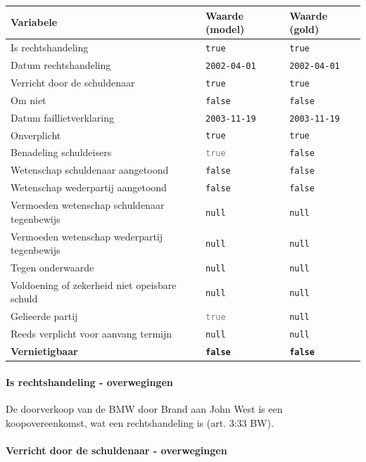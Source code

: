 \documentclass[
  dutch,
  a4paper,
]{article}
\begin{document}
\begin{center}
\small
\begin{tabular}{@{}p{7.4cm}p{2.6cm}p{2.6cm}@{}}
\toprule
Variabele & Waarde (model) & Waarde (gold) \\
\midrule
Is rechtshandeling & \texttt{true} & \texttt{true} \\
Datum rechtshandeling & \texttt{2002-04-01} & \texttt{2002-04-01} \\
Verricht door de schuldenaar & \texttt{true} & \texttt{true} \\
Om niet & \texttt{false} & \texttt{false} \\
Datum faillietverklaring & \texttt{2003-11-19} & \texttt{2003-11-19} \\
Onverplicht & \texttt{true} & \texttt{true} \\
Benadeling schuldeisers & \textcolor{gray}{\texttt{true}} & \texttt{false} \\
Wetenschap schuldenaar aangetoond & \texttt{false} & \texttt{false} \\
Wetenschap wederpartij aangetoond & \texttt{false} & \texttt{false} \\
Vermoeden wetenschap schuldenaar tegenbewijs & \texttt{null} & \texttt{null} \\
Vermoeden wetenschap wederpartij tegenbewijs & \texttt{null} & \texttt{null} \\
Tegen onderwaarde & \texttt{null} & \texttt{null} \\
Voldoening of zekerheid niet opeisbare schuld & \texttt{null} & \texttt{null} \\
Gelieerde partij & \textcolor{gray}{\texttt{true}} & \texttt{null} \\
Reeds verplicht voor aanvang termijn & \texttt{null} & \texttt{null} \\
\textbf{Vernietigbaar} & \textbf{\texttt{false}} & \textbf{\texttt{false}} \\
\bottomrule
\end{tabular}
\end{center}

\paragraph{Is rechtshandeling - overwegingen}\label{is-rechtshandeling---overwegingen-60}

De doorverkoop van de BMW door Brand aan John West is een koopovereenkomst, wat een rechtshandeling is (art. 3:33 BW).

\paragraph{Verricht door de schuldenaar - overwegingen}\label{verricht-door-de-schuldenaar---overwegingen-60}
\end{document}
